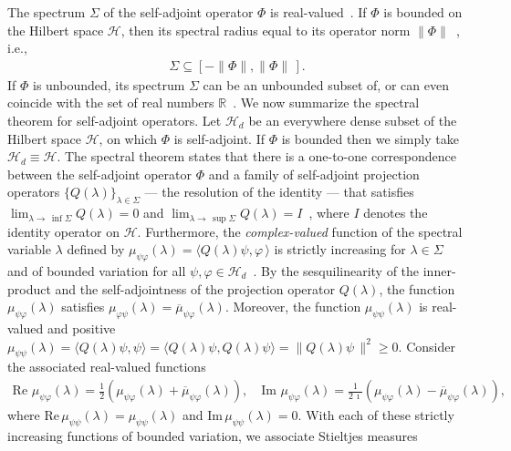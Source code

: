 \documentclass[leqno,onefignum,onetabnum]{siamltex1213}
\newcommand\Real{\mbox{Re}\,} %
\newcommand\Imag{\mbox{Im}\,} %
\newcommand{\Hs}{\mathscr{H}}
\begin{document}
The spectrum $\Sigma$ of the self-adjoint operator $\Phi$ is
real-valued~\cite{Reed-1980,Stone:64}. If $\Phi$ is bounded on the
Hilbert space $\Hs$, then its spectral radius equal to its operator
norm $\|\Phi\|$~\cite{Reed-1980}, i.e.,
%
\begin{align}\label{eq:Spectral_Radius_Phi}
  \Sigma\subseteq[-\|\Phi\|,\|\Phi\|\,].
\end{align}
%
If $\Phi$ is unbounded, its spectrum $\Sigma$ can be an unbounded subset of,
or can even coincide with the set of real numbers
$\mathbb{R}$~\cite{Stone:64}. 
We now summarize the spectral theorem for self-adjoint operators. Let
$\Hs_d$ be an everywhere dense subset of the Hilbert space $\Hs$, on
which $\Phi$ is self-adjoint. If $\Phi$ is 
bounded then we simply take $\Hs_d\equiv\Hs$. The spectral theorem states that
there is a one-to-one correspondence between the self-adjoint
operator $\Phi$ and a family of self-adjoint projection operators
$\{Q(\lambda)\}_{\lambda\in\Sigma}$ --- the resolution of the identity --- that satisfies
$\lim_{\lambda\to\,\inf{\Sigma}}Q(\lambda)=0$ and
$\lim_{\lambda\to\,\sup{\Sigma}}Q(\lambda)=I$~\cite{Stone:64}, where $I$ denotes the 
identity operator on $\Hs$. Furthermore, the \emph{complex-valued}
function of the spectral variable $\lambda$ defined by $\mu_{\psi\varphi}(\lambda)=\langle
Q(\lambda)\psi,\varphi\,\rangle$ is strictly 
increasing for $\lambda\in\Sigma$ and of bounded variation for all
$\psi,\varphi\in\Hs_d$~\cite{Stone:64}. By the sesquilinearity of the
inner-product and the self-adjointness of the projection operator
$Q(\lambda)$, the function $\mu_{\psi\varphi}(\lambda)$ satisfies
$\mu_{\varphi\psi}(\lambda)=\overline{\mu}_{\psi\varphi}(\lambda)$. Moreover, the function $\mu_{\psi\psi}(\lambda)$
is real-valued and positive $\mu_{\psi\psi}(\lambda)=\langle Q(\lambda)\psi,\psi\rangle=\langle
Q(\lambda)\psi,Q(\lambda)\psi\rangle=\|Q(\lambda)\psi\,\|^2\geq0$. 
Consider the associated real-valued functions   
%
\begin{align}\label{eq:Fns_Bounded_Var}
  \Real\,\mu_{\psi\varphi}(\lambda)
         =\frac{1}{2}\left(\mu_{\psi\varphi}(\lambda)+\overline{\mu}_{\psi\varphi}(\lambda)\right), \quad
  \Imag\,\mu_{\psi\varphi}(\lambda)
         =\frac{1}{2\,\imath}\left(\mu_{\psi\varphi}(\lambda)-\overline{\mu}_{\psi\varphi}(\lambda)\right),
\end{align}
%
where $\Real\mu_{\psi\psi}(\lambda)=\mu_{\psi\psi}(\lambda)$ and $\Imag\mu_{\psi\psi}(\lambda)=0$. With each of
these strictly increasing functions of bounded variation, we associate
Stieltjes measures~\cite{Stieltjes:1995,Stone:64,Folland:99} 
\end{document}
